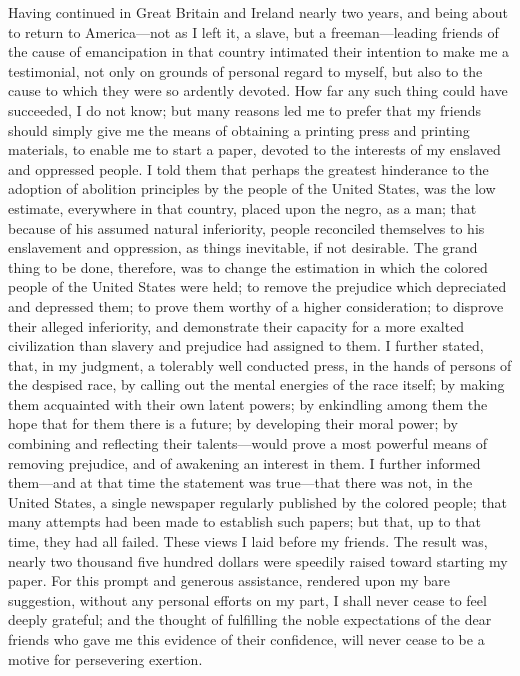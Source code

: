 Having continued in Great Britain and Ireland nearly two years, and
being about to return to America---not as I left it, a slave, but a
freeman---leading friends of the cause of emancipation in that country
intimated their intention to make me a testimonial, not only on grounds
of personal regard to myself, but also to the cause to which they were
so ardently devoted. How far any such thing could have succeeded, I do
not know; but many reasons led me to prefer that my friends should
simply give me the means of obtaining a printing press and printing
materials, to enable me to start a paper, devoted to the interests of my
enslaved and oppressed people. I {}told them that perhaps the greatest
hinderance to the adoption of abolition principles by the people of the
United States, was the low estimate, everywhere in that country, placed
upon the negro, as a man; that because of his assumed natural
inferiority, people reconciled themselves to his enslavement and
oppression, as things inevitable, if not desirable. The grand thing to
be done, therefore, was to change the estimation in which the colored
people of the United States were held; to remove the prejudice which
depreciated and depressed them; to prove them worthy of a higher
consideration; to disprove their alleged inferiority, and demonstrate
their capacity for a more exalted civilization than slavery and
prejudice had assigned to them. I further stated, that, in my judgment,
a tolerably well conducted press, in the hands of persons of the
despised race, by calling out the mental energies of the race itself; by
making them acquainted with their own latent powers; by enkindling among
them the hope that for them there is a future; by developing their moral
power; by combining and reflecting their talents---would prove a most
powerful means of removing prejudice, and of awakening an interest in
them. I further informed them---and at that time the statement was
true---that there was not, in the United States, a single newspaper
regularly published by the colored people; that many attempts had been
made to establish such papers; but that, up to that time, they had all
failed. These views I laid before my friends. The result was, nearly two
thousand five hundred dollars were speedily raised toward starting my
paper. For this {}prompt and generous assistance, rendered upon my bare
suggestion, without any personal efforts on my part, I shall never cease
to feel deeply grateful; and the thought of fulfilling the noble
expectations of the dear friends who gave me this evidence of their
confidence, will never cease to be a motive for persevering exertion.

